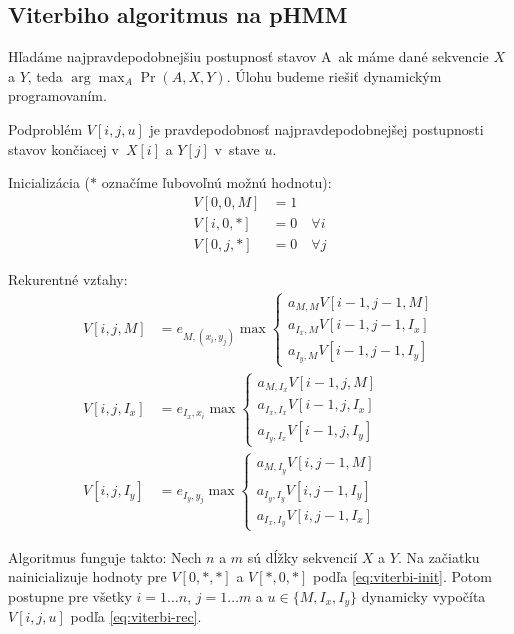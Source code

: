 \subsection{Viterbiho algoritmus na pHMM}
Hľadáme najpravdepodobnejšiu postupnosť stavov A~ak máme dané sekvencie $X$ a $Y$, teda $\arg\max_A \Pr(A, X, Y)$. Úlohu budeme riešiť dynamickým programovaním.

Podproblém $V[i, j, u]$ je pravdepodobnosť najpravdepodobnejšej postupnosti stavov končiacej v~$X[i]$ a $Y[j]$ v~stave $u$.

Inicializácia ($*$ označíme ľubovoľnú možnú hodnotu):
\begin{subequations}
\label{eq:viterbi-init}
\begin{align}
V[0,0,M] &= 1 \\
V[i,0,*] &= 0 \quad \forall i\\
V[0,j,*] &= 0 \quad \forall j
\end{align}
\end{subequations}

Rekurentné vzťahy:
\begin{subequations}
\label{eq:viterbi-rec}
\begin{align}
\label{eq:viterbi-recM}
V[i,j,M] &= e_{M, (x_i, y_j)} \max \left\{
\begin{array}{l}
a_{M,M} V[i-1,j-1,M]\\
a_{I_x,M} V[i-1,j-1,I_x]\\
a_{I_y,M} V[i-1,j-1, I_y]
\end{array} \right.\\
\label{eq:viterbi-recX}
V[i,j, I_x] &= e_{I_x, x_i}\max \left\{
\begin{array}{l}
a_{M, I_x} V[i-1,j,M]\\
a_{I_x, I_x} V[i-1,j,I_x]\\
a_{I_y, I_x} V[i-1,j,I_y]
\end{array} \right.\\
\label{eq:viterbi-recY}
V[i,j, I_y] &= e_{I_y, y_j}\max \left\{
\begin{array}{l}
a_{M, I_y} V[i,j-1,M]\\
a_{I_y, I_y} V[i,j-1,I_y]\\
a_{I_x, I_y} V[i,j-1,I_x]
\end{array} \right.
\end{align}
\end{subequations}

Algoritmus funguje takto:
Nech $n$ a $m$ sú dĺžky sekvencií $X$ a $Y$.
Na začiatku nainicializuje hodnoty pre $V[0,*,*]$ a $V[*,0,*]$ podľa \ref{eq:viterbi-init}.
Potom postupne pre všetky $i = 1\dots n$, $j = 1\dots m$ a $u \in \{M, I_x, I_y\}$ dynamicky vypočíta $V[i, j, u]$ podľa \ref{eq:viterbi-rec}.

